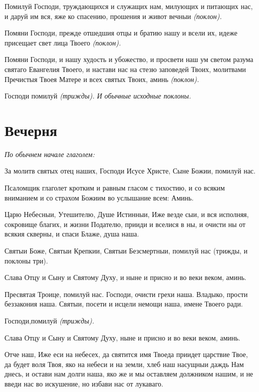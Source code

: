 Помилуй Господи, труждающихся и служащих нам, милующих и питающих нас, и даруй им вся, яже ко спасению, прошения и живот вечныи \itshape (поклон)\normalfont{}.


Помяни Господи, прежде отшедшия отцы и братию нашу и всели их, идеже присещает свет лица Твоего \itshape (поклон)\normalfont{}.


Помяни Господи, и нашу худость и убожество, и просвети наш ум светом разума святаго Евангелия Твоего, и настави нас на стезю заповедей Твоих, молитвами Пречистыя Твоея Матере и всех святых Твоих, аминь \itshape (поклон)\normalfont{}.


Господи помилуй \itshape (трижды)\normalfont{}. И обычные исходные поклоны.




\section{Вечерня}
 


\itshape По обычнем начале глаголем:\normalfont{}


За молитв святых отец наших, Господи Исусе Христе, Сыне Божии, помилуй нас.


Псаломщик глаголет кротким и равным гласом с тихостию, и со всяким вниманием и со страхом Божиим во услышание всем: Аминь.


Царю Небесныи, Утешителю, Душе Истинныи, Иже везде сыи, и вся исполняя, сокровище благих, и жизни Подателю, прииди и вселися в ны, и очисти ны от всякия скверны, и спаси Блаже, душа наша.


Святыи Боже, Святыи Крепкии, Святыи Безсмертныи, помилуй нас (трижды, и поклоны три).


Слава Отцу и Сыну и Святому Духу, и ныне и присно и во веки веком, аминь.


Пресвятая Троице, помилуй нас. Господи, очисти грехи наша. Владыко, прости беззакония наша. Святыи, посети и исцели немощи наша, имене Твоего ради.


Господи,помилуй \itshape (трижды)\normalfont{}.


Слава Отцу и Сыну и Святому Духу, ныне и присно и во веки веком, аминь.


Отче наш, Иже еси на небесех, да святится имя Твоеда приидет царствие Твое, да будет воля Твоя, яко на небеси и на земли, хлеб наш насущныи даждь Нам днесь, и остави нам долги наша, яко же и мы оставляем должником нашим, и не введи нас во искушение, но избави нас от лукаваго.


